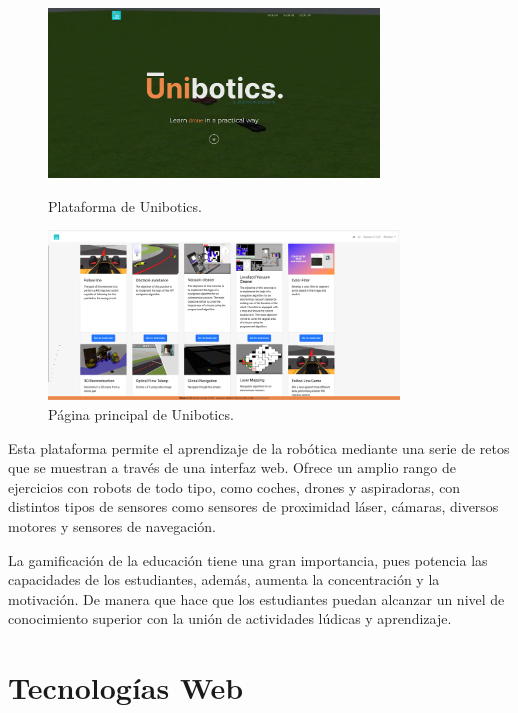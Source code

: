 \documentclass[a4paper, 12pt]{book}
\begin{document}
\begin{figure}[H]
  \centering
  \begin{minipage}[b]{0.45\textwidth}
    \includegraphics[width=\textwidth,height=45mm]{img/plataforma_unibotics.png}
    \caption{Plataforma de Unibotics.}
    \label{figura:stun}
  \end{minipage}
  \hfill
  \begin{minipage}[b]{0.45\textwidth}
    \includegraphics[width=\textwidth,height=45mm]{img/pagina_principal_unibotics.png}
    \caption{Página principal de Unibotics.}
    \label{figura:turn}
  \end{minipage}
\end{figure}

Esta plataforma permite el aprendizaje de la robótica mediante una serie de retos que se muestran a través de una interfaz web. Ofrece un amplio rango de ejercicios con robots de todo tipo, como coches, drones y aspiradoras, con distintos tipos de sensores como sensores de proximidad láser, cámaras, diversos motores y sensores de navegación.

La gamificación de la educación tiene una gran importancia, pues potencia las capacidades de los estudiantes, además, aumenta la concentración y la motivación. De manera que hace que los estudiantes puedan alcanzar un nivel de conocimiento superior con la unión de actividades lúdicas y aprendizaje.


\section{Tecnologías Web}
\end{document}
